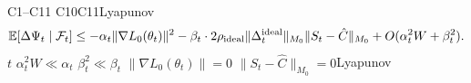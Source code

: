 \subsection{}

\begin{theorem}[ Lyapunov ——]\label{thm:lyapunov-proven}
 C1--C11 C10C11Lyapunov 
\begin{equation}\label{eq:lyapunov-final}
    \mathbb{E}[\Delta\Psi_t \mid \mathcal{F}_t] \leq -\alpha_t \|\nabla L_0(\theta_t)\|^2 - \beta_t \cdot 2\rho_{\text{ideal}} \|\Delta_t^{\text{ideal}}\|_{M_0} \|S_t - \hat{C}\|_{M_0} + O(\alpha_t^2 W + \beta_t^2).
\end{equation}
 $t$ $\alpha_t^2 W \ll \alpha_t$  $\beta_t^2 \ll \beta_t$ $\|\nabla L_0(\theta_t)\| = 0$ \textbf{} $\|S_t - \hat{C}\|_{M_0} = 0$Lyapunov 
\end{theorem}

